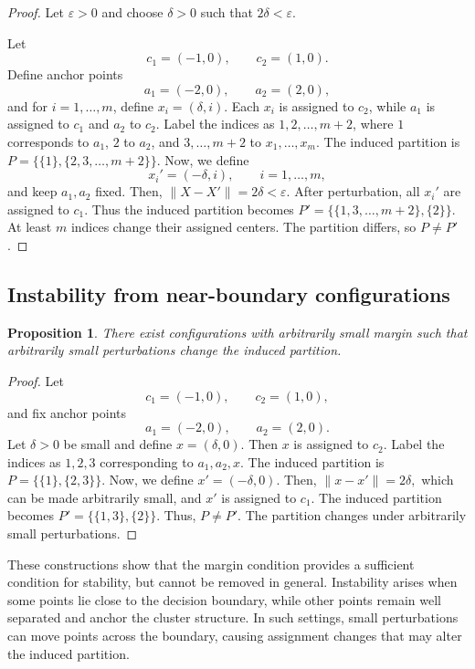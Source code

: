 \documentclass[11pt]{amsart}
\theoremstyle{plain}
\newtheorem{proposition}[subsection]{Proposition}
\theoremstyle{definition}
\begin{document}
\begin{proof}
Let $\varepsilon > 0$ and choose $\delta > 0$ such that $2\delta < \varepsilon$.

Let
\[
c_1 = (-1,0), \qquad c_2 = (1,0).
\]
Define anchor points
\[
a_1 = (-2,0), \qquad a_2 = (2,0),
\]
and for $i = 1,\ldots,m$, define
$x_i = (\delta,i).$ Each $x_i$ is assigned to $c_2$, while $a_1$ is assigned to $c_1$ and $a_2$ to $c_2$. Label the indices as $1,2,\ldots,m+2$, where $1$ corresponds to $a_1$, $2$ to $a_2$, and $3,\ldots,m+2$ to $x_1,\ldots,x_m$. The induced partition is
$P = \{\{1\}, \{2,3,\ldots,m+2\}\}.$
Now, we define
\[
x_i' = (-\delta,i), \qquad i = 1,\ldots,m,
\]
and keep $a_1,a_2$ fixed. Then,
$\|X - X'\| = 2\delta < \varepsilon.$
After perturbation, all $x_i'$ are assigned to $c_1$. Thus the induced partition becomes
$P' = \{\{1,3,\ldots,m+2\}, \{2\}\}.$ At least $m$ indices change their assigned centers. The partition differs, so $P \ne P'$.
\end{proof}

\subsection{Instability from near-boundary configurations}

\begin{proposition}
There exist configurations with arbitrarily small margin such that arbitrarily small perturbations change the induced partition.
\end{proposition}

\begin{proof}
Let
\[
c_1 = (-1,0), \qquad c_2 = (1,0),
\]
and fix anchor points
\[
a_1 = (-2,0), \qquad a_2 = (2,0).
\]
Let $\delta > 0$ be small and define
$x = (\delta,0).$
Then $x$ is assigned to $c_2$. Label the indices as $1,2,3$ corresponding to $a_1,a_2,x$. The induced partition is
$P = \{\{1\}, \{2,3\}\}.$
Now, we define
$x' = (-\delta,0).$
Then,
$\|x - x'\| = 2\delta,$
which can be made arbitrarily small, and $x'$ is assigned to $c_1$. The induced partition becomes
$P' = \{\{1,3\}, \{2\}\}.$
Thus, $P \ne P'$. The partition changes under arbitrarily small perturbations.
\end{proof}

These constructions show that the margin condition provides a sufficient condition for stability, but cannot be removed in general. Instability arises when some points lie close to the decision boundary, while other points remain well separated and anchor the cluster structure. In such settings, small perturbations can move points across the boundary, causing assignment changes that may alter the induced partition.
\end{document}
